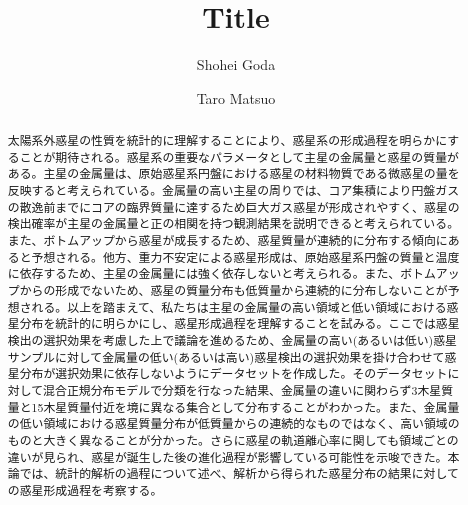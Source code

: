 \documentclass[twocolumn, dvipdfmx]{aastex62}
\begin{document}
\begin{CJK*}{UTF8}{min}

\title{Title}

\author{Shohei Goda}

\author{Taro Matsuo}


\begin{abstract}

太陽系外惑星の性質を統計的に理解することにより、惑星系の形成過程を明らかにすることが期待される。惑星系の重要なパラメータとして主星の金属量と惑星の質量がある。主星の金属量は、原始惑星系円盤における惑星の材料物質である微惑星の量を反映すると考えられている。金属量の高い主星の周りでは、コア集積により円盤ガスの散逸前までにコアの臨界質量に達するため巨大ガス惑星が形成されやすく、惑星の検出確率が主星の金属量と正の相関を持つ観測結果を説明できると考えられている。また、ボトムアップから惑星が成長するため、惑星質量が連続的に分布する傾向にあると予想される。他方、重力不安定による惑星形成は、原始惑星系円盤の質量と温度に依存するため、主星の金属量には強く依存しないと考えられる。また、ボトムアップからの形成でないため、惑星の質量分布も低質量から連続的に分布しないことが予想される。以上を踏まえて、私たちは主星の金属量の高い領域と低い領域における惑星分布を統計的に明らかにし、惑星形成過程を理解することを試みる。ここでは惑星検出の選択効果を考慮した上で議論を進めるため、金属量の高い(あるいは低い)惑星サンプルに対して金属量の低い(あるいは高い)惑星検出の選択効果を掛け合わせて惑星分布が選択効果に依存しないようにデータセットを作成した。そのデータセットに対して混合正規分布モデルで分類を行なった結果、金属量の違いに関わらず3木星質量と15木星質量付近を境に異なる集合として分布することがわかった。また、金属量の低い領域における惑星質量分布が低質量からの連続的なものではなく、高い領域のものと大きく異なることが分かった。さらに惑星の軌道離心率に関しても領域ごとの違いが見られ、惑星が誕生した後の進化過程が影響している可能性を示唆できた。本論では、統計的解析の過程について述べ、解析から得られた惑星分布の結果に対しての惑星形成過程を考察する。


\end{abstract}

\vspace{1cm}




\end{CJK*}
\end{document}

